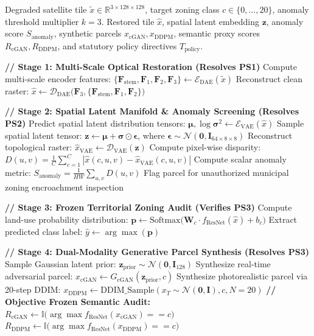 \documentclass[journal]{IEEEtran}
\begin{document}
\begin{algorithm}[!t]
\caption{UrbanGen AI Multi-Stage Cooperative Execution and Semantic Auditing Pipeline}
\label{alg:urbangen}
\begin{algorithmic}[1]
\REQUIRE Degraded satellite tile $\tilde{x} \in \mathbb{R}^{3 \times 128 \times 128}$, target zoning class $c \in \{0, \dots, 20\}$, anomaly threshold multiplier $k=3$.
\ENSURE Restored tile $\hat{x}$, spatial latent embedding $\mathbf{z}$, anomaly score $S_{\text{anomaly}}$, synthetic parcels $x_{\text{cGAN}}, x_{\text{DDPM}}$, semantic proxy scores $R_{\text{cGAN}}, R_{\text{DDPM}}$, and statutory policy directives $T_{\text{policy}}$.

\STATE \textbf{// Stage 1: Multi-Scale Optical Restoration (Resolves PS1)}
\STATE Compute multi-scale encoder features: $\{\mathbf{F}_{\text{stem}}, \mathbf{F}_1, \mathbf{F}_2, \mathbf{F}_3\} \leftarrow \mathcal{E}_{\text{DAE}}(\tilde{x})$
\STATE Reconstruct clean raster: $\hat{x} \leftarrow \mathcal{D}_{\text{DAE}}\big(\mathbf{F}_3, \{\mathbf{F}_{\text{stem}}, \mathbf{F}_1, \mathbf{F}_2\}\big)$

\STATE \textbf{// Stage 2: Spatial Latent Manifold \& Anomaly Screening (Resolves PS2)}
\STATE Predict spatial latent distribution tensors: $\bm{\mu}, \log \bm{\sigma}^2 \leftarrow \mathcal{E}_{\text{VAE}}(\hat{x})$
\STATE Sample spatial latent tensor: $\mathbf{z} \leftarrow \bm{\mu} + \bm{\sigma} \odot \bm{\epsilon}$, where $\bm{\epsilon} \sim \mathcal{N}(\mathbf{0}, \mathbf{I}_{64 \times 8 \times 8})$
\STATE Reconstruct topological raster: $\hat{x}_{\text{VAE}} \leftarrow \mathcal{D}_{\text{VAE}}(\mathbf{z})$
\STATE Compute pixel-wise disparity: $D(u, v) = \frac{1}{C}\sum_{c=1}^C |\hat{x}(c, u, v) - \hat{x}_{\text{VAE}}(c, u, v)|$
\STATE Compute scalar anomaly metric: $S_{\text{anomaly}} = \frac{1}{HW}\sum_{u, v} D(u, v)$
    \STATE Flag parcel for unauthorized municipal zoning encroachment inspection
\ENDIF

\STATE \textbf{// Stage 3: Frozen Territorial Zoning Audit (Verifies PS3)}
\STATE Compute land-use probability distribution: $\mathbf{p} \leftarrow \text{Softmax}\big(\mathbf{W}_c \cdot f_{\text{ResNet}}(\hat{x}) + b_c\big)$
\STATE Extract predicted class label: $\hat{y} \leftarrow \arg\max(\mathbf{p})$

\STATE \textbf{// Stage 4: Dual-Modality Generative Parcel Synthesis (Resolves PS3)}
\STATE Sample Gaussian latent prior: $\mathbf{z}_{\text{prior}} \sim \mathcal{N}(\mathbf{0}, \mathbf{I}_{128})$
\STATE Synthesize real-time adversarial parcel: $x_{\text{cGAN}} \leftarrow G_{\text{cGAN}}(\mathbf{z}_{\text{prior}}, c)$
\STATE Synthesize photorealistic parcel via 20-step DDIM: $x_{\text{DDPM}} \leftarrow \text{DDIM\_Sample}(x_T \sim \mathcal{N}(\mathbf{0}, \mathbf{I}), c, N=20)$
\STATE \textbf{// Objective Frozen Semantic Audit:}
\STATE $R_{\text{cGAN}} \leftarrow \mathbb{I}\big(\arg\max f_{\text{ResNet}}(x_{\text{cGAN}}) == c\big)$
\STATE $R_{\text{DDPM}} \leftarrow \mathbb{I}\big(\arg\max f_{\text{ResNet}}(x_{\text{DDPM}}) == c\big)$


\end{algorithmic}
\end{algorithm}
\end{document}
